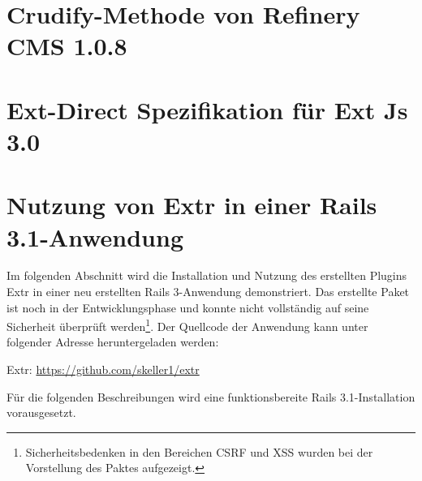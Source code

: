 \pagebreak


\section{Crudify-Methode von Refinery CMS 1.0.8}




\section{Ext-Direct Spezifikation für Ext Js 3.0}
\label{extspec}


\section{Nutzung von Extr in einer Rails 3.1-Anwendung}


Im folgenden Abschnitt wird die Installation und Nutzung des erstellten Plugins Extr in einer neu erstellten Rails 3-Anwendung demonstriert. Das erstellte Paket ist noch in der Entwicklungsphase und konnte nicht vollständig auf seine Sicherheit überprüft werden\footnote{Sicherheitsbedenken in den Bereichen CSRF und XSS wurden bei der Vorstellung des Paktes aufgezeigt.}. Der Quellcode der Anwendung kann unter folgender Adresse heruntergeladen werden:

Extr: \href{https://github.com/skeller1/extr}{https://github.com/skeller1/extr}

Für die folgenden Beschreibungen wird eine funktionsbereite Rails 3.1-Installation vorausgesetzt.

